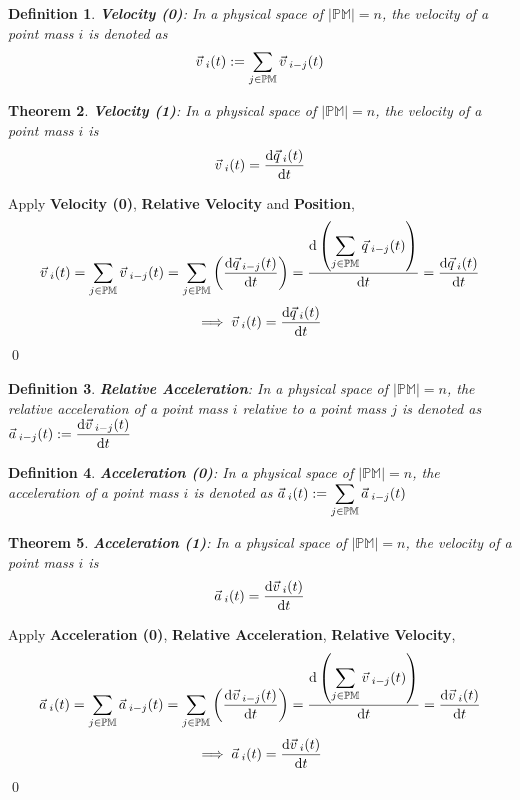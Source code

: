 \documentclass[12pt]{amsart}
\newtheorem{theorem}{Theorem}[section]
\newtheorem{definition}[theorem]{Definition}
\renewenvironment{proof}{{\bfseries Proof.}}{\qed}
\let\oldvec\vec
\renewcommand{\vec}[1]{\oldvec{#1}\hspace{0.1em}}
\begin{document}
\begin{definition}
\textbf{Velocity (0)}: In a physical space of $\left | \mathbb{PM} \right | = n$, the velocity of a point mass $i$ is denoted as
$$\vec{v}_i(t) := \displaystyle \sum_{j \in \mathbb{PM}} \vec{v}_{i-j} (t)$$
\end{definition}

\begin{theorem}
\textbf{Velocity (1)}: In a physical space of $\left | \mathbb{PM} \right | = n$, the velocity of a point mass $i$ is
$$\vec{v}_i(t) = \dfrac{\mathrm{d} \vec{q}_{i} (t)}{\mathrm{d} t}$$
\end{theorem}

\begin{proof}
    Apply \textbf{Velocity (0)}, \textbf{Relative Velocity} and \textbf{Position},
    $$\vec{v}_i (t) = \sum_{j \in \mathbb{PM}} \vec{v}_{i-j} (t) = \sum_{j \in \mathbb{PM}} \left ( \dfrac{\mathrm{d} \vec{q}_{i-j}(t)}{\mathrm{d} t} \right )= \dfrac{\mathrm{d} \left ( \displaystyle \sum_{j \in \mathbb{PM}} \vec{q}_{i-j}(t) \right )}{\mathrm{d} t} = \dfrac{\mathrm{d} \vec{q}_{i}(t)}{\mathrm{d} t} $$
    $$\implies \vec{v}_i(t) = \dfrac{\mathrm{d} \vec{q}_{i} (t)}{\mathrm{d} t} $$
\end{proof}

\begin{definition}
\textbf{Relative Acceleration}: In a physical space of $\left | \mathbb{PM} \right | = n$, the relative acceleration of a point mass $i$ relative to a point mass $j$ is denoted as $\vec{a}_{i-j}(t) := \dfrac{\mathrm{d} \vec{v}_{i-j} (t)}{\mathrm{d} t} $
\end{definition}

\begin{definition}
\textbf{Acceleration (0)}: In a physical space of $\left | \mathbb{PM} \right | = n$, the acceleration of a point mass $i$ is denoted as $\vec{a}_i(t) := \displaystyle \sum_{j \in \mathbb{PM}} \vec{a}_{i-j} (t)$
\end{definition}

\begin{theorem}
\textbf{Acceleration (1)}: In a physical space of $\left | \mathbb{PM} \right | = n$, the velocity of a point mass $i$ is $$\vec{a}_i(t) = \dfrac{\mathrm{d} \vec{v}_{i} (t)}{\mathrm{d} t}$$
\end{theorem}

\begin{proof}
    Apply \textbf{Acceleration (0)}, \textbf{Relative Acceleration}, \textbf{Relative Velocity},
    $$\vec{a}_i (t) = \sum_{j \in \mathbb{PM}} \vec{a}_{i-j} (t) = \sum_{j \in \mathbb{PM}} \left ( \dfrac{\mathrm{d} \vec{v}_{i-j}(t)}{\mathrm{d} t} \right )= \dfrac{\mathrm{d} \left ( \displaystyle \sum_{j \in \mathbb{PM}} \vec{v}_{i-j}(t) \right )}{\mathrm{d} t} = \dfrac{\mathrm{d} \vec{v}_{i}(t)}{\mathrm{d} t} $$
    $$\implies \vec{a}_i(t) = \dfrac{\mathrm{d} \vec{v}_{i} (t)}{\mathrm{d} t} $$
\end{proof}
\end{document}
